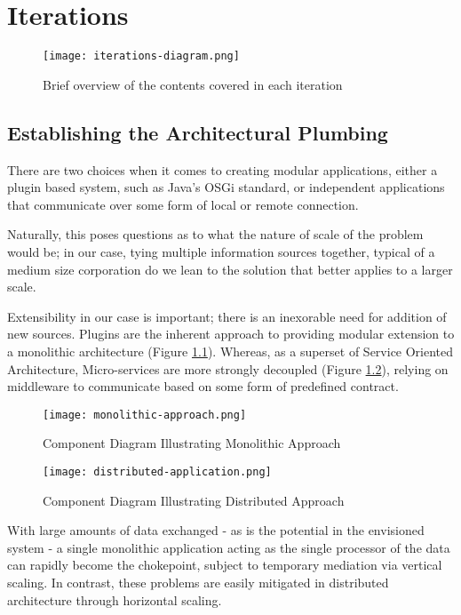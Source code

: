\chapter{Iterations}

\begin{figure}[h!]
	\centering
	\texttt{[image: iterations-diagram.png]}
	\caption{Brief overview of the contents covered in each iteration}
\end{figure}

\newpage
\section{Establishing the Architectural Plumbing}

There are two choices when it comes to creating modular applications, either a plugin based system, such as Java’s OSGi standard, or independent applications that communicate over some form of local or remote connection.

Naturally, this poses questions as to what the nature of scale of the problem would be; in our case, tying multiple information sources together, typical of a medium size corporation do we lean to the solution that better applies to a larger scale.

Extensibility in our case is important; there is an inexorable need for addition of new sources. Plugins are the inherent approach to providing modular extension to a monolithic architecture (Figure \ref{fig:monolithic-approach}). Whereas, as a superset of Service Oriented Architecture, Micro-services are more strongly decoupled (Figure \ref{fig:distributed-approach}), relying on middleware to communicate based on some form of predefined contract.

\begin{figure}[h!]
	\centering
	\texttt{[image: monolithic-approach.png]}
	\caption{Component Diagram Illustrating Monolithic Approach}
	\label{fig:monolithic-approach}
\end{figure}

\begin{figure}[h!]
	\centering
	\texttt{[image: distributed-application.png]}
	\caption{Component Diagram Illustrating Distributed Approach}
	\label{fig:distributed-approach}
\end{figure}

With large amounts of data exchanged - as is the potential in the envisioned system - a single monolithic application acting as the single processor of the data can rapidly become the chokepoint, subject to temporary mediation via vertical scaling. In contrast, these problems are easily mitigated in distributed architecture through horizontal scaling.

